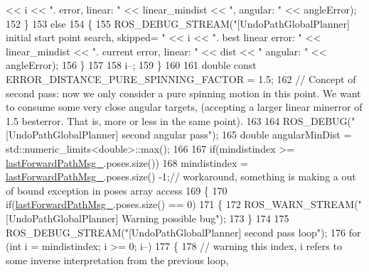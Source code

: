 \begin{DoxyCode}
       << i << \textcolor{stringliteral}{". error, linear: "} << linear\_mindist << \textcolor{stringliteral}{", angular: "} << angleError);
152                 \}
153                 \textcolor{keywordflow}{else}
154                 \{
155                     ROS\_DEBUG\_STREAM(\textcolor{stringliteral}{"[UndoPathGlobalPlanner] initial start point search, skipped= "} << i 
      << \textcolor{stringliteral}{". best linear error: "} << linear\_mindist << \textcolor{stringliteral}{". current error, linear: "} << dist << \textcolor{stringliteral}{" angular: "} << 
      angleError);
156                 \}
157 
158                 i--;
159             \}
160 
161             \textcolor{keywordtype}{double} \textcolor{keyword}{const} ERROR\_DISTANCE\_PURE\_SPINNING\_FACTOR = 1.5;
162             \textcolor{comment}{// Concept of second pass: now we only consider a pure spinning motion in this point. We want
       to consume some very close angular targets, (accepting a larger linear minerror of 1.5 besterror. That is,
       more or less in the same point).}
163 
164             ROS\_DEBUG(\textcolor{stringliteral}{"[UndoPathGlobalPlanner] second angular pass"});
165             \textcolor{keywordtype}{double} angularMinDist = std::numeric\_limits<double>::max();
166             
167                 \textcolor{keywordflow}{if}(mindistindex >=  \hyperlink{classcl__move__base__z_1_1undo__path__global__planner_1_1UndoPathGlobalPlanner_a9a4a6e40f5b6cb5f77dedbc5b6170871}{lastForwardPathMsg\_}.poses.size())
168                     mindistindex = \hyperlink{classcl__move__base__z_1_1undo__path__global__planner_1_1UndoPathGlobalPlanner_a9a4a6e40f5b6cb5f77dedbc5b6170871}{lastForwardPathMsg\_}.poses.size() -1;\textcolor{comment}{// workaround,
       something is making a out of bound exception in poses array access}
169             \{
170                 \textcolor{keywordflow}{if}(\hyperlink{classcl__move__base__z_1_1undo__path__global__planner_1_1UndoPathGlobalPlanner_a9a4a6e40f5b6cb5f77dedbc5b6170871}{lastForwardPathMsg\_}.poses.size() == 0)
171                 \{
172                     ROS\_WARN\_STREAM(\textcolor{stringliteral}{"[UndoPathGlobalPlanner] Warning possible bug"});
173                 \}
174 
175                 ROS\_DEBUG\_STREAM(\textcolor{stringliteral}{"[UndoPathGlobalPlanner] second pass loop"});
176                 \textcolor{keywordflow}{for} (\textcolor{keywordtype}{int} i = mindistindex; i >= 0; i--)
177                 \{
178                     \textcolor{comment}{// warning this index, i refers to some inverse interpretation from the previous loop,}

\end{DoxyCode}
